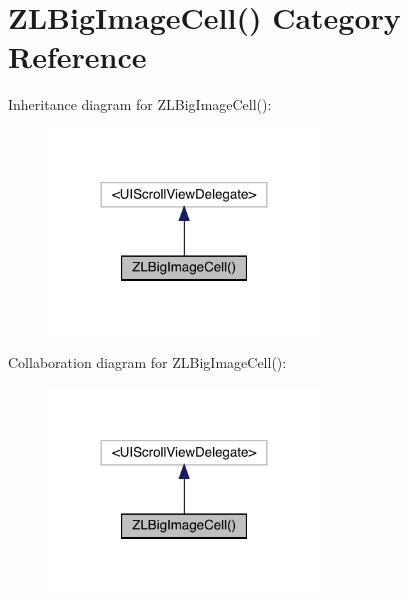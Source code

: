 \hypertarget{category_z_l_big_image_cell_07_08}{}\section{Z\+L\+Big\+Image\+Cell() Category Reference}
\label{category_z_l_big_image_cell_07_08}


Inheritance diagram for Z\+L\+Big\+Image\+Cell()\+:\nopagebreak
\begin{figure}[H]
\begin{center}
\leavevmode
\includegraphics[width=204pt]{category_z_l_big_image_cell_07_08__inherit__graph}
\end{center}
\end{figure}


Collaboration diagram for Z\+L\+Big\+Image\+Cell()\+:\nopagebreak
\begin{figure}[H]
\begin{center}
\leavevmode
\includegraphics[width=204pt]{category_z_l_big_image_cell_07_08__coll__graph}
\end{center}
\end{figure}
